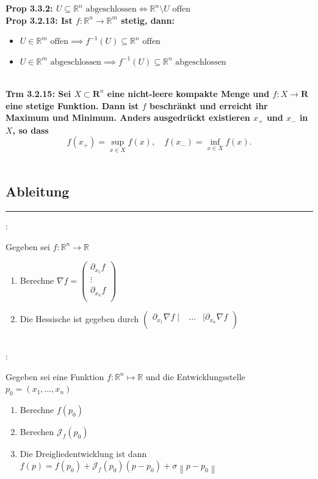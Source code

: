 \documentclass[7pt,landscape, margin = 0.1mm]{article}
\newcommand*{\mysubsection}[1]{\vspace{-2mm}\color{chaptercolor}\subsection{ #1 }
\vspace{-1mm}\hrule\vspace{1.5mm}\color{black}
\vspace{2mm}}
\newcommand{\KRZ}[2]{\vspace{1mm} \hline \vspace{1mm} \color{chaptercolor}{RC #1}:\color{black} \   \hspace{0.2cm}\vspace{1mm}   {\begin{minipage}{20em}
#2 \end{minipage}} \vspace{1mm}  \hline \vspace{1mm}  \\}
\newcommand{\PROP}[2]{\color{chaptercolor}\bf{Prop #1}:\color{black}    \hspace{0.2cm} #2 \\}
\newcommand{\THE}[2]{\color{chaptercolor}\bf{Trm #1}:\color{black}    \hspace{0.2cm} #2 \\}
\begin{document}
\begin{multicols}{4}
\begin{flushleft}
{\begin{itemize}
\end{itemize}

}


\PROP{3.3.2}{$U \subseteq \mathbb{R}^{n} \text{ abgeschlossen} \iff \mathbb{R}^{n}\setminus U \text{ offen}$}


\PROP{3.2.13}{
Ist $f: \mathbb{R}^{n}\to \mathbb{R}^{m}$ stetig, dann:
  
  \begin{itemize}
  
 
\item $U \in \mathbb{R}^{m} \text{ offen}\implies f^{-1}(U) \subseteq \mathbb{R}^{n} \text{ offen}$
\item $U \in \mathbb{R}^{m} \text{ abgeschlossen}\implies f^{-1}(U) \subseteq \mathbb{R}^{n} \text{ abgeschlossen}$
\end{itemize}   

}

\THE{3.2.15}{Sei $X \subset \mathbf{R}^n$ eine nicht-leere kompakte Menge und $f: X \rightarrow \mathbf{R}$ eine stetige Funktion. Dann ist $f$ beschränkt und erreicht ihr Maximum und Minimum. Anders ausgedrückt existieren $x_{+}$ und $x_{-}$ in $X$, so dass
$$
f\left(x_{+}\right)=\sup _{x \in X} f(x), \quad f\left(x_{-}\right)=\inf _{x \in X} f(x) .
$$}

\mysubsection{Ableitung}
\KRZ{Hessische}{
Gegeben sei $f: \mathbb{R}^n \rightarrow \mathbb{R}$
\begin{enumerate}
\item Berechne $\nabla f =  \begin{pmatrix}
\partial_{x_{1}} f  \\
\vdots \\
\partial_{x_{n}} f  \\
\end{pmatrix} $
\item Die Hessische ist gegeben durch 
$ \begin{pmatrix}
\partial_{x_{1}} \nabla f \mid & \ldots &  \mid \partial_{x_{n}} \nabla f  \\
\end{pmatrix}$
\end{enumerate}
}
\KRZ{Dreigliedentwicklung}{
Gegeben sei eine Funktion $f: \mathbb{R}^n \mapsto \mathbb{R}$ und die Entwicklungsstelle $p_0 = (x_1,  \ldots, x_n)$
\begin{enumerate}
\item Berechne $f(p_0)$
\item Berechen $\mathcal{J}_f(p_0)$
\item Die Dreigliedentwicklung ist dann $f(p)=f(p_0)+\mathcal{J}_f(p_0) (p-p_0) + \sigma \left\| p - p_0\right\|$
\end{enumerate}

}
\end{flushleft}
\end{multicols}
\end{document}
